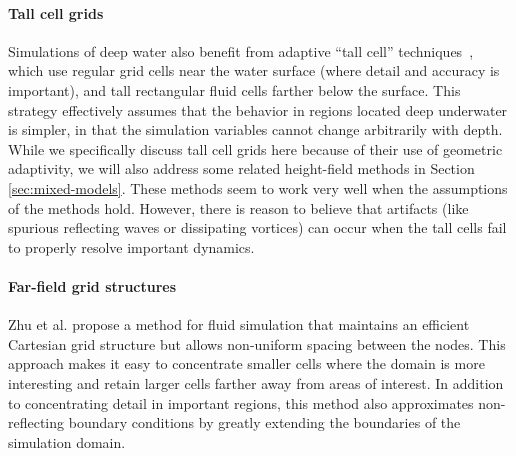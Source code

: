 \paragraph*{Tall cell grids} Simulations of deep water also benefit from adaptive ``tall cell'' techniques~\cite{Irving2006,Chentanez2011}, which use regular grid cells near the water surface (where detail and accuracy is important), and tall rectangular fluid cells farther below the surface. This strategy effectively assumes that the behavior in regions located deep underwater is simpler, in that the simulation variables cannot change arbitrarily with depth. While we specifically discuss tall cell grids here because of their use of geometric adaptivity, we will also address some related height-field methods in Section \ref{sec:mixed-models}. These methods seem to work very well when the assumptions of the methods hold. However, there is reason to believe that artifacts (like spurious reflecting waves or dissipating vortices) can occur when the tall cells fail to properly resolve important dynamics.

\paragraph*{Far-field grid structures} Zhu et al. \cite{Zhu2013} propose a method for fluid simulation that maintains an efficient Cartesian grid structure but allows non-uniform spacing between the nodes.
This approach makes it easy to concentrate smaller cells where the domain is more interesting and retain larger cells farther away from areas of interest.
In addition to concentrating detail in important regions, this method also approximates non-reflecting boundary conditions by greatly extending the boundaries of the simulation domain.

